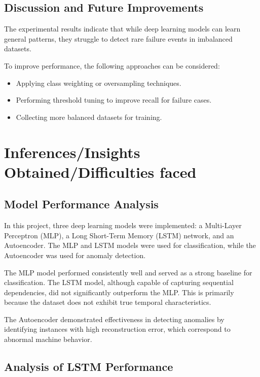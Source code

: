 \documentclass{ecsproject}     %
\begin{document}
\section{Discussion and Future Improvements}

The experimental results indicate that while deep learning models can learn general patterns, they struggle to detect rare failure events in imbalanced datasets.

To improve performance, the following approaches can be considered:

\begin{itemize}
    \item Applying class weighting or oversampling techniques.
    \item Performing threshold tuning to improve recall for failure cases.
    \item Collecting more balanced datasets for training.
\end{itemize}

\chapter{Inferences/Insights Obtained/Difficulties faced}

\section{Model Performance Analysis}

In this project, three deep learning models were implemented: a Multi-Layer Perceptron (MLP), a Long Short-Term Memory (LSTM) network, and an Autoencoder. The MLP and LSTM models were used for classification, while the Autoencoder was used for anomaly detection.

The MLP model performed consistently well and served as a strong baseline for classification. The LSTM model, although capable of capturing sequential dependencies, did not significantly outperform the MLP. This is primarily because the dataset does not exhibit true temporal characteristics.

The Autoencoder demonstrated effectiveness in detecting anomalies by identifying instances with high reconstruction error, which correspond to abnormal machine behavior.

\section{Analysis of LSTM Performance}
\end{document}
